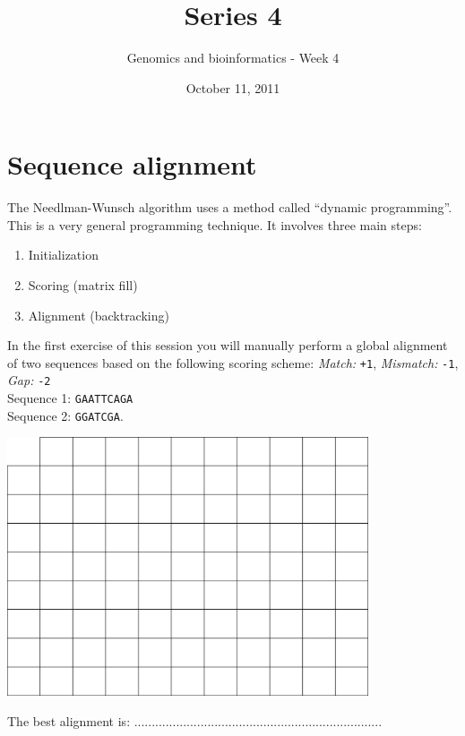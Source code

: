 \documentclass[a4paper,11pt]{article}
\title{Series 4}
\date{October 11, 2011}
\author{Genomics and bioinformatics - Week 4}
\begin{document}
\maketitle





\section{Sequence alignment}
The Needlman-Wunsch algorithm uses a method called ``dynamic programming''. This is a very general programming technique. It involves three main steps:
\begin{enumerate}
\item Initialization
\item Scoring (matrix fill)
\item Alignment (backtracking)
\end{enumerate}
In the first exercise of this session you will manually perform a global alignment of two sequences based on the following scoring scheme:
\emph{Match:} \texttt{+1}, \emph{Mismatch:} \texttt{-1}, \emph{Gap:} \texttt{-2}\\
Sequence 1: \texttt{GAATTCAGA}\\
Sequence 2: \texttt{GGATCGA}.
\vspace{0.5cm}
\begin{center}
\includegraphics[width=0.8\textwidth]{matrix.png}
\end{center}
\vspace{0.5cm}
The best alignment is: .......................................................................\\
\end{document}
